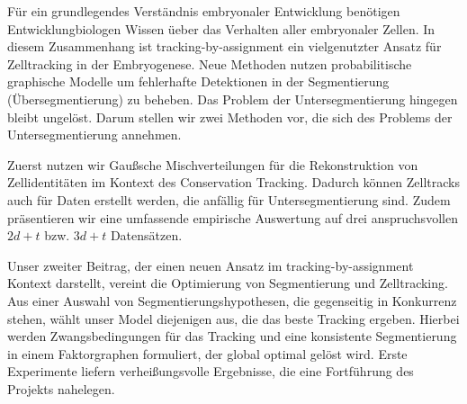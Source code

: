 


F\"ur ein grundlegendes Verst\"andnis embryonaler Entwicklung ben\"otigen Entwicklungbiologen Wissen
\"ueber das Verhalten aller embryonaler Zellen. In diesem Zusammenhang ist tracking-by-assignment
ein vielgenutzter Ansatz für Zelltracking in der Embryogenese. Neue Methoden nutzen probabilitische
graphische Modelle um fehlerhafte Detektionen in der Segmentierung (Übersegmentierung) zu
beheben. Das Problem der Untersegmentierung hingegen bleibt ungelöst. Darum stellen wir zwei
Methoden vor, die sich des Problems der Untersegmentierung annehmen.

Zuerst nutzen wir Gaußsche Mischverteilungen für die Rekonstruktion von Zellidentitäten im Kontext
des Conservation Tracking. Dadurch können Zelltracks auch für Daten erstellt werden, die anfällig
für Untersegmentierung sind. Zudem präsentieren wir eine umfassende empirische Auswertung auf drei
anspruchsvollen $2d+t$ bzw. $3d+t$ Datensätzen.

Unser zweiter Beitrag, der einen neuen Ansatz im tracking-by-assignment Kontext darstellt, vereint
die Optimierung von Segmentierung und Zelltracking. Aus einer Auswahl von Segmentierungshypothesen,
die gegenseitig in Konkurrenz stehen, wählt unser Model diejenigen aus, die das beste Tracking
ergeben. Hierbei werden Zwangsbedingungen für das Tracking und eine konsistente Segmentierung in
einem Faktorgraphen formuliert, der global optimal gelöst wird. Erste Experimente liefern
verheißungsvolle Ergebnisse, die eine Fortführung des Projekts nahelegen.

